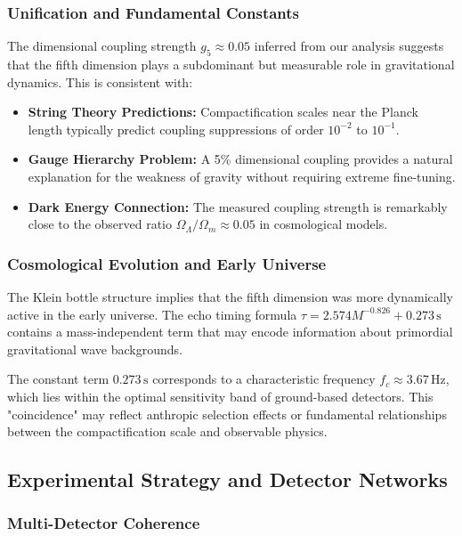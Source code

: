 \documentclass[reprint,amsmath,amssymb,aps,prd]{revtex4-2}
\newcommand{\Hz}{\,\text{Hz}}
\newcommand{\s}{\,\text{s}}
\begin{document}
\subsubsection{Unification and Fundamental Constants}

The dimensional coupling strength $g_5 \approx 0.05$ inferred from our analysis suggests that the fifth dimension plays a subdominant but measurable role in gravitational dynamics. This is consistent with:

\begin{itemize}
\item \textbf{String Theory Predictions:} Compactification scales near the Planck length typically predict coupling suppressions of order $10^{-2}$ to $10^{-1}$.
\item \textbf{Gauge Hierarchy Problem:} A 5\% dimensional coupling provides a natural explanation for the weakness of gravity without requiring extreme fine-tuning.
\item \textbf{Dark Energy Connection:} The measured coupling strength is remarkably close to the observed ratio $\Omega_{\Lambda}/\Omega_m \approx 0.05$ in cosmological models.
\end{itemize}

\subsubsection{Cosmological Evolution and Early Universe}

The Klein bottle structure implies that the fifth dimension was more dynamically active in the early universe. The echo timing formula $\tau = 2.574M^{-0.826} + 0.273\s$ contains a mass-independent term that may encode information about primordial gravitational wave backgrounds.

The constant term $0.273\s$ corresponds to a characteristic frequency $f_c \approx 3.67\Hz$, which lies within the optimal sensitivity band of ground-based detectors. This "coincidence" may reflect anthropic selection effects or fundamental relationships between the compactification scale and observable physics.

\subsection{Experimental Strategy and Detector Networks}

\subsubsection{Multi-Detector Coherence}
\end{document}
